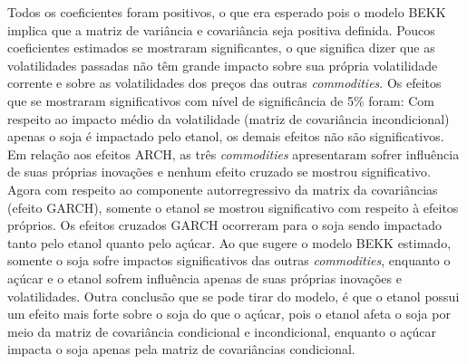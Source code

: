 \documentclass[]{article}
\begin{document}
Todos os coeficientes foram positivos, o que era esperado pois o modelo
BEKK implica que a matriz de variância e covariância seja positiva
definida. Poucos coeficientes estimados se mostraram significantes, o
que significa dizer que as volatilidades passadas não têm grande impacto
sobre sua própria volatilidade corrente e sobre as volatilidades dos
preços das outras \emph{commodities}. Os efeitos que se mostraram
significativos com nível de significância de 5\% foram: Com respeito ao
impacto médio da volatilidade (matriz de covariância incondicional)
apenas o soja é impactado pelo etanol, os demais efeitos não são
significativos. Em relação aos efeitos ARCH, as três \emph{commodities}
apresentaram sofrer influência de suas próprias inovações e nenhum
efeito cruzado se mostrou significativo. Agora com respeito ao
componente autorregressivo da matrix da covariâncias (efeito GARCH),
somente o etanol se mostrou significativo com respeito à efeitos
próprios. Os efeitos cruzados GARCH ocorreram para o soja sendo
impactado tanto pelo etanol quanto pelo açúcar. Ao que sugere o modelo
BEKK estimado, somente o soja sofre impactos significativos das outras
\emph{commodities}, enquanto o açúcar e o etanol sofrem influência
apenas de suas próprias inovações e volatilidades. Outra conclusão que
se pode tirar do modelo, é que o etanol possui um efeito mais forte
sobre o soja do que o açúcar, pois o etanol afeta o soja por meio da
matriz de covariância condicional e incondicional, enquanto o açúcar
impacta o soja apenas pela matriz de covariâncias condicional.
\end{document}
